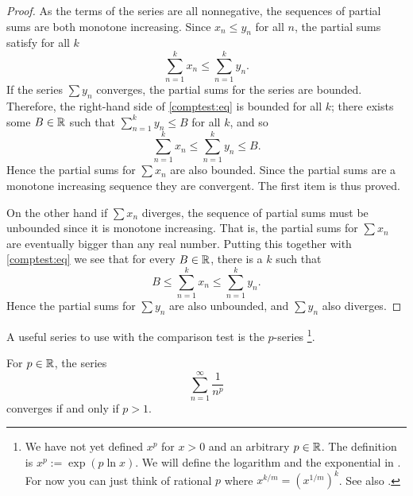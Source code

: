 \begin{proof}
As the terms of the series are all nonnegative, the sequences of
partial sums are both monotone increasing.
Since $x_n \leq y_n$ for all $n$, the partial sums
satisfy for all $k$
\begin{equation} \label{comptest:eq}
\sum_{n=1}^k x_n \leq \sum_{n=1}^k y_n .
\end{equation}
If the series $\sum y_n$ converges, the partial sums for the series
are bounded.  Therefore, the right-hand side of \eqref{comptest:eq}
is bounded for all $k$; there exists some $B \in {\mathbb{R}}$ such that
$\sum_{n=1}^k y_n \leq B$ for all $k$, and so
\begin{equation*}
\sum_{n=1}^k x_n \leq \sum_{n=1}^k y_n \leq B.
\end{equation*}
Hence the partial sums for $\sum x_n$
are also bounded.  Since the partial sums are a monotone increasing sequence
they are convergent.  The first item is thus proved.

On the other hand if $\sum x_n$ diverges, the sequence of partial sums
must be unbounded since it is monotone increasing.  That is, the partial
sums for $\sum x_n$ are eventually bigger than any real number.  Putting this
together with \eqref{comptest:eq} we see that for every $B \in
{\mathbb{R}}$, there is a $k$ such that 
\begin{equation*}
B \leq \sum_{n=1}^k x_n \leq \sum_{n=1}^k y_n .
\end{equation*}
Hence the partial sums for $\sum y_n$ are also unbounded, and $\sum
y_n$ also diverges.
\end{proof}

A useful series to use with the comparison test is the
$p$-series%
\footnote{We have not yet defined $x^p$ for $x > 0$ and
an arbitrary $p \in {\mathbb{R}}$.  The definition is $x^p := \exp ( p \ln x )$.
We will define the logarithm and the exponential in .
For now you can just think of rational $p$
where $x^{k/m} = {(x^{1/m})}^{k}$.  See also .}.

\begin{prop}%
For $p \in {\mathbb{R}}$, 
the series
\begin{equation*}
\sum_{n=1}^\infty \frac{1}{n^p}
\end{equation*}
converges if and only if $p > 1$.
\end{prop}

